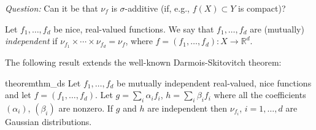 \documentclass[12pt]{article}
\newcommand{\todoc}[2][]{\todo[color=Apricot,#1]{#2}}
\newcommand{\ra}{\rightarrow}
\newcommand{\real}{\mathbb{R}}
\begin{document}
\emph{Question:} Can it be that $\nu_f$ is $\sigma$-additive (if, e.g., $f(X)\subset Y$ is compact)?


Let $f_1,\ldots, f_d$ be nice, real-valued functions.
We say that $f_1,\ldots, f_d$ are (mutually) \emph{independent}
 if $\nu_{f_1} \times \cdots \times \nu_{f_d} = \nu_f$, where $f = (f_1,\ldots, f_d):X\ra \real^d$.

The following result extends the well-known Darmois-Skitovitch theorem:
\begin{restatable}{theorem}{thm_ds}
Let $f_1,\ldots,f_d$ be mutually independent real-valued, nice functions and let $f = (f_1,\ldots,f_d)$.
Let $g = \sum_i \alpha_i f_i$, $h = \sum_i \beta_i f_i$ where all the coefficients $(\alpha_i)$, $(\beta_i)$ are nonzero.
If $g$ and $h$ are independent then $\nu_{f_i}$, $i=1,\ldots,d$ are Gaussian distributions.
\end{restatable}
\end{document}
